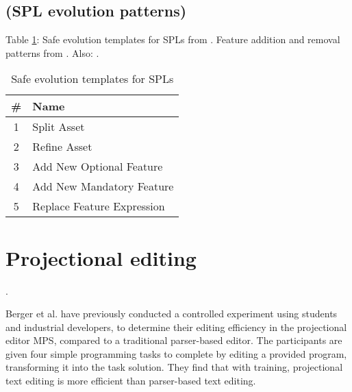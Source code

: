 \subsection{(SPL evolution patterns)}
Table \ref{tab:safeevo}: Safe evolution templates for SPLs from \cite{neves2011evolution}. Feature addition and removal patterns from \cite{passos2016coevolution}. Also: \cite{stanciulescu2016concepts}.
\begin{table}[h]
    \centering
    \caption{Safe evolution templates for SPLs \cite{neves2011evolution}}
    \label{tab:safeevo}
    \begin{tabular}{c|l}
    \hline
        \textbf{\#} & \textbf{Name} \\\hline
        1 & Split Asset \\
        2 & Refine Asset \\
        3 & Add New Optional Feature \\
        4 & Add New Mandatory Feature \\
        5 & Replace Feature Expression
    \end{tabular}
\end{table}


\section{Projectional editing}
\cite{voelter2014towards} \cite{stanciulescu2016concepts} \cite{behringer2017peopl}.

Berger et al. \cite{berger2016mps} have previously conducted a controlled experiment using students and industrial developers, to determine their editing efficiency in the projectional editor MPS, compared to a traditional parser-based editor. The participants are given four simple programming tasks to complete by editing a provided program, transforming it into the task solution. They find that with training, projectional text editing is more efficient than parser-based text editing.

